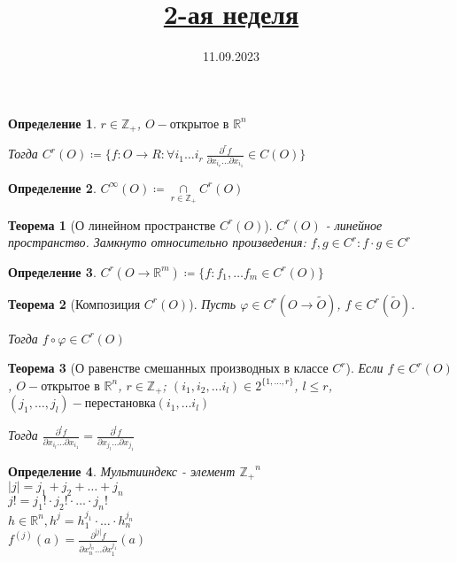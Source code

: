 \documentclass[11pt,a4paper,oneside]{scrartcl}
\title{\href{https://www.youtube.com/live/CfB6Jk_3U4o?si=kOlWnc-YSZmP9kN7}{2-ая неделя}}
\date{11.09.2023}
\newtheorem{definition}{Определение}
\newtheorem{theorem}{Теорема}
\begin{document}
\pagestyle{empty}

\maketitle

\begin{definition}
    $r \in \mathbb{Z_+}$, $O - \text{открытое в } \mathbb{R}^n$

    Тогда $C^r(O) \coloneqq \{ f \colon O \rightarrow R :
    \forall i_1 \dots i_r \ \frac{\partial^r f}{\partial x_{i_r} \dots \partial x_{i_1}} \in C(O) \}$
\end{definition}

\begin{definition}
    $C^{\infty} (O) \coloneqq \underset{r \in \mathbb{Z_+}}{\cap} C^r (O)$
\end{definition}

\begin{theorem}[О линейном пространстве $C^r (O)$]
    $C^r (O)$ - линейное пространство.
    Замкнуто относительно произведения: $f, g \in C^r : f \cdot g \in C^r$
\end{theorem}

\begin{definition}
    $C^r (O \rightarrow \mathbb{R}^m) \coloneqq \{f : f_1, \dots f_m \in C^r(O)\} $
\end{definition}

\begin{theorem}[Композиция $C^r (O)$]
    Пусть $\varphi \in C^r (O \rightarrow \tilde{O})$, $f \in C^r(\tilde{O})$.

    Тогда $f \circ \varphi \in C^r (O)$
\end{theorem}

\begin{theorem}[О равенстве смешанных производных в классе $C^r$]
    Если $f \in C^r (O)$, $O - \text{открытое в } \mathbb{R}^n$, $r \in \mathbb{Z_+}$;
    $(i_1, i_2, \dots i_l) \in 2^{ \{1, \dots, r\} }$, $l \leq r$,
    $(j_1, \dots, j_l) - \text{перестановка} (i_1, \dots i_l)$

    Тогда $\frac{\partial^l f}{\partial x_{i_l} \dots \partial x_{i_1}}
        = \frac{\partial^l f}{\partial x_{j_l} \dots \partial x_{j_1}}$
\end{theorem}

\begin{definition}
    Мультииндекс - элемент $\mathbb{Z_+}^n$ \\
    $|j| = j_1 + j_2 + \dots + j_n$ \\
    $j! = j_1! \cdot j_2! \cdot \dots \cdot j_n!$ \\
    $h \in \mathbb{R}^n, h^j = h_1^{j_1} \cdot \dots \cdot h_n^{j_n}$ \\
    $f^(j) (a) = \frac{\partial^{|j|} f}{\partial x_n^{j_n} \dots \partial x_1^{j_1}} (a)$
\end{definition}
\end{document}
